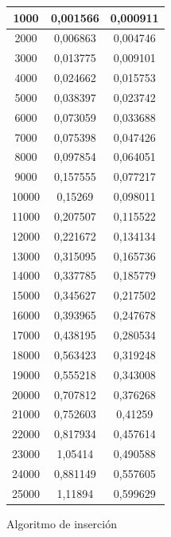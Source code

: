 \documentclass[12pt,spanish]{article}
\begin{document}
\begin{figure}[H]
\begin{tabular}{|c|c|c|}
\hline
1000  & 0,001566 & 0,000911 \\
\hline
2000  & 0,006863 & 0,004746\\
\hline
3000  & 0,013775 & 0,009101\\
\hline
4000  & 0,024662 & 0,015753\\
\hline
5000  & 0,038397 & 0,023742\\
\hline
6000  & 0,073059 & 0,033688\\
\hline
7000  & 0,075398 & 0,047426\\
\hline
8000  & 0,097854 & 0,064051\\
\hline
9000  & 0,157555 & 0,077217\\
\hline
10000 & 0,15269  & 0,098011\\
\hline
11000 & 0,207507 &  0,115522\\
\hline
12000 & 0,221672 &  0,134134\\
\hline
13000 & 0,315095 &  0,165736\\
\hline
14000 & 0,337785 & 0,185779\\
\hline
15000 & 0,345627 & 0,217502\\
\hline
16000 & 0,393965 & 0,247678\\
\hline
17000 & 0,438195 & 0,280534\\
\hline
18000 & 0,563423 & 0,319248\\
\hline
19000 & 0,555218 & 0,343008\\
\hline
20000 & 0,707812 & 0,376268\\
\hline
21000 & 0,752603 & 0,41259\\
\hline
22000 & 0,817934 & 0,457614\\
\hline
23000 & 1,05414  & 0,490588\\
\hline
24000 & 0,881149 & 0,557605\\
\hline
25000 & 1,11894  & 0,599629\\
\hline
\end{tabular}
\caption{Algoritmo de inserción}
\end{figure}
\end{document}
